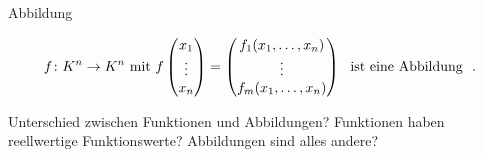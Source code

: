 \documentclass[class=article, crop=false]{standalone}
\begin{document}
\begin{zettel}{Abbildung}
\begin{flashcard}
\begin{definition}[Abbildung]
\[
f \from K^n\to  K^n \tx{mit} f \begin{pmatrix}
x_1 \\
\vdots \\
x_n \\
\end{pmatrix} =
\begin{pmatrix}
f_1 (x_1, \dots , x_n) \\
\vdots \\
f_m (x_1, \dots, x_n) \\
\end{pmatrix} \tx{ ist eine Abbildung } 
.\]

\end{definition}
\end{flashcard}

Unterschied zwischen Funktionen und Abbildungen? Funktionen haben reellwertige Funktionswerte? Abbildungen sind alles andere?
\end{zettel}
\end{document}
